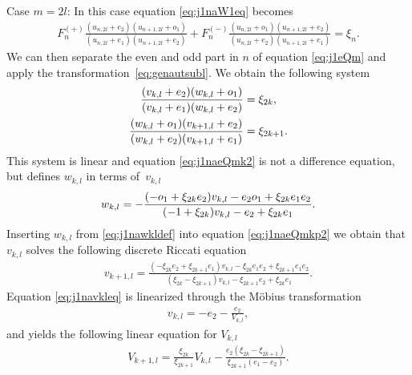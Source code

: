 \documentclass[pdftex]{sigma}
\numberwithin{equation}{section}
\begin{document}
Case $m=2l$: In this case equation \eqref{eq:j1naW1eq} becomes
 \begin{gather}
F_n^{(+)}{\frac { ( u_{{n,2l}}+e_2 ) ( u_{{n+1,2l}}+o_1) }{ ( u_{{n,2l}}+ e_1 )
 ( u_{{n+1,2l}}+e_2 ) }}+F_n^{(-)} {\frac { ( u_{{n,2l}}+o_1 ) ( u_{{n+1,2l}}+ e_2 ) }{ ( u_{{n,2l}}+e_2 )
 ( u_{{n+1,2l}}+e_1 ) }} =\xi_{n}.
 \label{eq:j1eQm}
 \end{gather}
 We can then separate the even and odd part in $n$ of equation \eqref{eq:j1eQm} and apply the transforma\-tion~\eqref{eq:genautsubl}.
 We obtain the following system
 \begin{subequations} \label{eq:j1naeQmsys}
 \begin{gather}
 {\frac { ( v_{{k,l}}+{ e_2} )
 ( w_{{k,l}}+{ o_1} ) }{ ( v_{{k,l}}+{ e_1} )
 ( w_{{k,l}}+{ e_2} ) }} =\xi_{{2 k}}, \label{eq:j1naeQmk2} \\
 {\frac { ( w_{{k,l}}+{ o_1} )
 ( v_{{k+1,l}}+{ e_2} ) }{%
 ( w_{{k,l}}+{ e_2} )
 ( v_{{k+1,l}}+{ e_1} ) }} =\xi_{{2 k+1}}. \label{eq:j1naeQmkp2}
 \end{gather}
 \end{subequations}
 This system is linear and equation \eqref{eq:j1naeQmk2} is not a dif\/ference equation, but def\/ines
 $w_{k,l}$ in terms of~$v_{k,l}$
 \begin{gather}
 w_{{k,l}}=-{\frac { ( -{ o_1}+\xi_{{2 k}}{ e_2} ) v_{{k,l}}
 -{ e_2} { o_1}+\xi_{{2 k}}{ e_1} { e_2}}{%
( -1+\xi_{{2 k}} ) v_{{k,l}}-{ e_2}+\xi_{{2 k}}{ e_1}}}. \label{eq:j1nawkldef}
 \end{gather}
 Inserting $w_{k,l}$ from \eqref{eq:j1nawkldef} into
 equation \eqref{eq:j1naeQmkp2} we obtain that
 $v_{k,l}$ solves the following discrete Riccati equation
 \begin{gather}
 v_{{k+1,l}}={\frac {
( -\xi_{{2 k}}{ e_2}+\xi_{{2 k+1}}{ e_1} )
 v_{{k,l}}
 -\xi_{{2 k}}{ e_1} { e_2}+\xi_{{2 k+1}}{ e_1} { e_2}}{
( \xi_{{2 k}}-\xi_{{2 k+1}} )
 v_{{k,l}}-\xi_{{2 k+1}}{ e_2}+\xi_{{2 k}}{ e_1}}}. \label{eq:j1navkleq}
 \end{gather}
 Equation \eqref{eq:j1navkleq} is linearized through the M\"obius transformation
 \begin{gather}
 v_{{k,l}}=-{ e_2}-{\frac {{ e_2}}{V_{{k,l}}}}, \label{eq:j1naVkldef}
 \end{gather}
 and yields the following linear equation for $V_{k,l}$
 \begin{gather}
 V_{{k+1,l}}={\frac {\xi_{{2 k}}}{\xi_{{2 k+1}}}}V_{{k,l}}
 -{\frac {{ e_2} ( \xi_{{2 k}}-\xi_{{2 k+1}} ) }{
 \xi_{{2 k+1}} ( { e_1}-{ e_2} ) }}. \label{eq:j1naVkleq}
 \end{gather}
\end{document}
